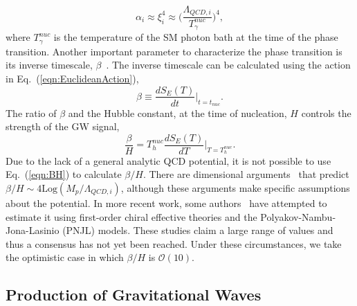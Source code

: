 \documentclass[nofootinbib,twocolumn,preprintnumbers]{revtex4-1}
\begin{document}
%
\begin{equation}\label{eqn:alpha2}
\alpha_i \approx \xi_i^{4} \approx \bigg( \frac{\Lambda_{QCD,i}}{T_{\gamma}^{nuc}}\bigg)^4,
\end{equation}
%
where $T_{\gamma}^{nuc}$ is the temperature of the SM photon bath at the time of the phase transition. Another important parameter to characterize the phase transition is its inverse timescale, $\beta$~\citep{Caprini:2015zlo}. The inverse timescale can be calculated using the action in Eq.~(\ref{eqn:EuclideanAction}), 
\begin{equation}
\beta  \equiv \frac{dS_{E}(T)}{dt}\bigg|_{t = t_{nuc}}.
\end{equation}
The ratio of $\beta$ and the Hubble constant, at the time of nucleation, $H$ controls the strength of the GW signal,
\begin{equation}\label{eqn:BH}
\frac{\beta}{H} = T^{nuc}_h \frac{dS_{E}(T)}{dT}\bigg|_{T = T^{nuc}_h}.
\end{equation}
Due to the lack of a general analytic QCD potential, it is not possible to use Eq.~(\ref{eqn:BH}) to calculate $\beta/H$. There are dimensional arguments~\cite{Hogan:1984hx,Hogan:1986qda} that predict $\beta/H \sim 4 \textrm{Log}(M_{p}/ \Lambda_{QCD,i})$, although these arguments make specific assumptions about the potential. In more recent work, some authors~\citep{Helmboldt:2019pan,Bai:2018dxf} have attempted to estimate it using first-order chiral effective theories and the Polyakov-Nambu-Jona-Lasinio (PNJL) models. These studies claim a large range of values and thus a consensus has not yet been reached.  Under these circumstances, we take the optimistic case in which $\beta/H$ is $\mathcal{O}(10)$.



\subsection{Production of Gravitational Waves}
\label{sec:signals}
\end{document}
